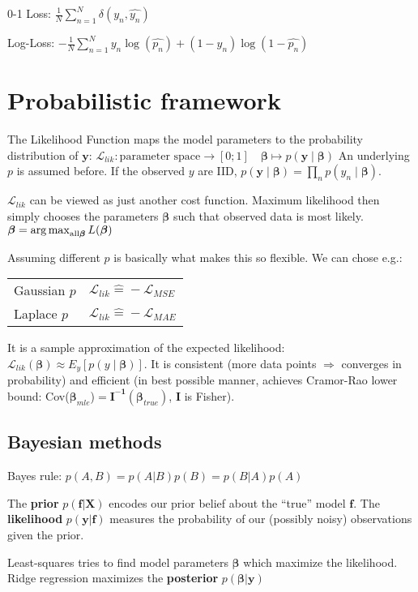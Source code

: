 \documentclass[10pt,a4paper,landscape]{article}
\renewcommand{\bf}[1]{\ensuremath{\mathbf{#1}}}
\newcommand{\bbeta}{\boldsymbol\beta}
\begin{document}
\begin{multicols*}{4}
0-1 Loss: $ \frac{1}{N} \sum_{n=1}^{N} \delta(y_n, \hat{y_n})$

Log-Loss: $- \frac{1}{N}  \sum_{n=1}^{N} y_n \log(\hat{p_n}) + (1-y_n) \log(1-\hat{p_n})$


\section{Probabilistic framework}
The Likelihood Function maps the model parameters to the probability distribution of $\bf{y}$:
$\mathcal{L}_{lik}\colon \text{parameter space} \to [0;1]\quad  \bbeta \mapsto p(\bf{y} \mid  \bbeta)$
An underlying $p$ is assumed before. If the observed $y$ are IID, $p(\bf{y} \mid \bbeta) = \prod_n p(y_n \mid \bbeta)$.

$\mathcal{L}_{lik}$ can be viewed as just another cost function. Maximum likelihood then simply chooses the parameters $\bbeta$ such that observed data is most likely. $\bbeta = \argmax_{\text{all} \bbeta} L(\bbeta)$

Assuming different $p$ is basically what makes this so flexible. We can chose e.g.:

\begin{tabular}{ l  l }
  \hline
  Gaussian $p$ & $\mathcal{L}_{lik} \widehat{=} -\mathcal{L}_{MSE}$ \\
  Laplace $p$  & $\mathcal{L}_{lik} \widehat{=} -\mathcal{L}_{MAE}$ \\
  \hline
\end{tabular}

It is a sample approximation of the expected likelihood:
$\mathcal{L}_{lik}(\bbeta) \approx E_y[ p(y \mid \bbeta) ]$.
It is consistent (more data points $\Rightarrow$ converges in probability) and efficient (in best possible manner, achieves Cramor-Rao lower bound: Cov($\bbeta_{mle}$)$=\bf{I^{-1}}(\bbeta_{true})$, $\bf{I}$ is Fisher).

\subsection{Bayesian methods}
Bayes rule: $p(A, B) = p(A|B) p(B) = p(B|A) p(A)$

The \textbf{prior} $p(\bf{f}|\bf{X})$ encodes our prior belief about the ``true'' model $\bf{f}$. The \textbf{likelihood} $p(\bf{y}|\bf{f})$ measures the probability of our (possibly noisy) observations given the prior.

Least-squares tries to find model parameters $\bbeta$ which maximize the likelihood. Ridge regression maximizes the \textbf{posterior} $p(\bbeta|\bf{y})$


\end{multicols*}
\end{document}
